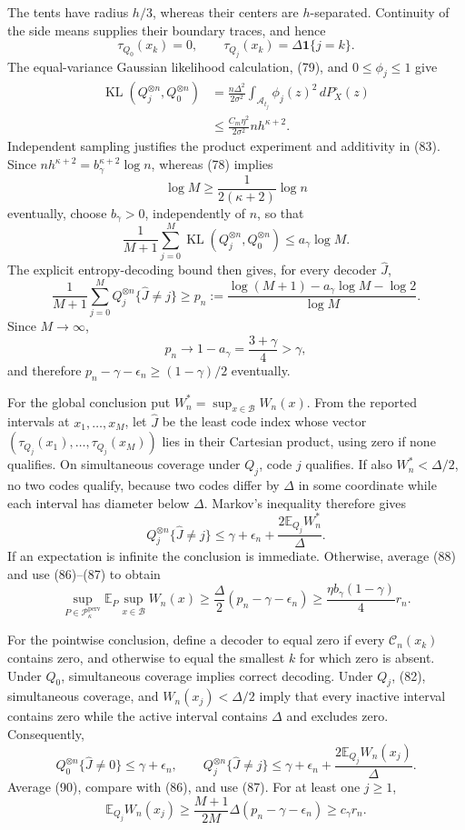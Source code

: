 The tents have radius \(h/3\), whereas their centers are
\(h\)-separated.  Continuity of the side means supplies their boundary
traces, and hence
\[
 \tau_{Q_0}(x_k)=0,
 \qquad \tau_{Q_j}(x_k)=\Delta\mathbf1\{j=k\}.
 \tag{82}
\]
The equal-variance Gaussian likelihood calculation, (79), and
\(0\le\phi_j\le1\) give
\[
 \begin{aligned}
 \operatorname{KL}(Q_j^{\otimes n},Q_0^{\otimes n})
 &=\frac{n\Delta^2}{2\sigma^2}
   \int_{\mathcal A_{t_j}}\phi_j(z)^2\,dP_X^\circ(z)\\
 &\le\frac{C_m\eta^2}{2\sigma^2}nh^{\kappa+2}.
 \end{aligned}
 \tag{83}
\]
Independent sampling justifies the product experiment and additivity in
(83).  Since \(nh^{\kappa+2}=b_\gamma^{\kappa+2}\log n\), whereas (78)
implies
\[
 \log M\ge\frac{1}{2(\kappa+2)}\log n
 \tag{84}
\]
eventually, choose \(b_\gamma>0\), independently of \(n\), so that
\[
 \frac1{M+1}\sum_{j=0}^M
 \operatorname{KL}(Q_j^{\otimes n},Q_0^{\otimes n})
 \le a_\gamma\log M.
 \tag{85}
\]
The explicit entropy-decoding bound then gives, for every decoder
\(\widehat J\),
\[
 \frac1{M+1}\sum_{j=0}^M Q_j^{\otimes n}\{\widehat J\ne j\}
 \ge p_n:=
 \frac{\log(M+1)-a_\gamma\log M-\log2}{\log M}.
 \tag{86}
\]
Since \(M\to\infty\),
\[
 p_n\longrightarrow1-a_\gamma=\frac{3+\gamma}{4}>\gamma,
 \tag{87}
\]
and therefore \(p_n-\gamma-\epsilon_n\ge(1-\gamma)/2\) eventually.

For the global conclusion put
\(W_n^*=\sup_{x\in\mathcal B}W_n(x)\).  From the reported intervals at
\(x_1,\ldots,x_M\), let \(\widehat J\) be the least code index whose
vector \((\tau_{Q_j}(x_1),\ldots,\tau_{Q_j}(x_M))\) lies in their
Cartesian product, using zero if none qualifies.  On simultaneous
coverage under \(Q_j\), code \(j\) qualifies.  If also
\(W_n^*<\Delta/2\), no two codes qualify, because two codes differ by
\(\Delta\) in some coordinate while each interval has diameter below
\(\Delta\).  Markov's inequality therefore gives
\[
 Q_j^{\otimes n}\{\widehat J\ne j\}
 \le\gamma+\epsilon_n+
 \frac{2\mathbb E_{Q_j}W_n^*}{\Delta}.
 \tag{88}
\]
If an expectation is infinite the conclusion is immediate.  Otherwise,
average (88) and use (86)--(87) to obtain
\[
 \sup_{P\in\mathcal P_{\kappa}^{\mathrm{perv}}}
 \mathbb E_P\sup_{x\in\mathcal B}W_n(x)
 \ge\frac\Delta2(p_n-\gamma-\epsilon_n)
 \ge\frac{\eta b_\gamma(1-\gamma)}4r_n.
 \tag{89}
\]

For the pointwise conclusion, define a decoder to equal zero if every
\(\mathcal C_n(x_k)\) contains zero, and otherwise to equal the smallest
\(k\) for which zero is absent.  Under \(Q_0\), simultaneous coverage
implies correct decoding.  Under \(Q_j\), (82), simultaneous coverage,
and \(W_n(x_j)<\Delta/2\) imply that every inactive interval contains
zero while the active interval contains \(\Delta\) and excludes zero.
Consequently,
\[
 Q_0^{\otimes n}\{\widehat J\ne0\}\le\gamma+\epsilon_n,
 \qquad
 Q_j^{\otimes n}\{\widehat J\ne j\}
 \le\gamma+\epsilon_n+
 \frac{2\mathbb E_{Q_j}W_n(x_j)}\Delta.
 \tag{90}
\]
Average (90), compare with (86), and use (87).  For at least one
\(j\ge1\),
\[
 \mathbb E_{Q_j}W_n(x_j)
 \ge\frac{M+1}{2M}\Delta(p_n-\gamma-\epsilon_n)
 \ge c_\gamma r_n.
 \tag{91}
\]

